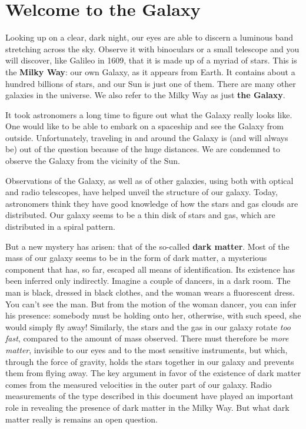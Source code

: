 \chapter{Welcome to the Galaxy}

Looking up on a clear, dark night, our eyes are able to discern a luminous band
stretching across the sky.  Observe it with  binoculars or a small telescope
and you will discover, like Galileo in 1609, that it is made up of a myriad of
stars.  This is the {\bf Milky Way}: our own Galaxy, as it appears from Earth.
It contains about a  hundred billions of stars, and our Sun is just one of
them. There are many other galaxies in the universe. We also refer to the Milky
Way as just {\bf the Galaxy}.

It took astronomers a long time to figure out what the Galaxy really looks
like.  One would like to be able to embark on a spaceship and see the Galaxy
from outside.  Unfortunately, traveling in and around the Galaxy is (and will
always be) out of the question because of the huge distances.  We are condemned
to observe the Galaxy from the vicinity of the Sun.  


Observations of the Galaxy, as well as of other galaxies, using both with
optical and radio telescopes, have helped unveil the structure of our galaxy.
Today, astronomers think they have good knowledge of how the stars and gas
clouds are distributed.  Our galaxy seems to be a thin disk of stars and gas,
which are distributed in a spiral pattern.

But a new mystery has arisen: that of the so-called {\bf dark matter}.  Most of
the mass of our galaxy seems to be in the form of dark matter, a mysterious
component that has, so far, escaped all means of identification.  Its existence
has been inferred only indirectly. Imagine a couple of dancers, in a dark room.
The man is black, dressed in black clothes, and the woman wears a fluorescent
dress. You can't see the man. But from the motion of the woman dancer, you can
infer his presence: somebody must be holding onto her, otherwise, with such
speed, she would simply fly away!  Similarly, the stars and the gas in our
galaxy rotate {\em too fast}, compared to the amount of mass observed. There
must therefore be {\em more matter}, invisible to our eyes and to the most
sensitive instruments, but which, through the force of gravity, holds the stars
together in our galaxy and prevents them from flying away. The key argument in
favor of the existence of dark matter comes from the measured velocities in the
outer part of our galaxy.  Radio measurements of the type described in this
document have played an important role in revealing the presence of dark matter
in the Milky Way. But what dark matter really is remains an open question.

